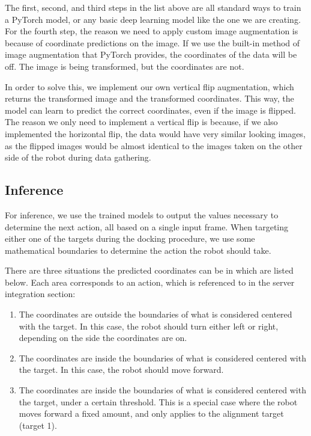 The first, second, and third steps in the list above are all standard ways to train a PyTorch model, or any basic deep learning model like the one we are creating. For the fourth step, the reason we need to apply custom image augmentation is because of coordinate predictions on the image. If we use the built-in method of image augmentation that PyTorch provides, the coordinates of the data will be off. The image is being transformed, but the coordinates are not.

In order to solve this, we implement our own vertical flip augmentation, which returns the transformed image and the transformed coordinates. This way, the model can learn to predict the correct coordinates, even if the image is flipped. The reason we only need to implement a vertical flip is because, if we also implemented the horizontal flip, the data would have very similar looking images, as the flipped images would be almost identical to the images taken on the other side of the robot during data gathering.

\subsection{Inference}
For inference, we use the trained models to output the values necessary to determine the next action, all based on a single input frame. When targeting either one of the targets during the docking procedure, we use some mathematical boundaries to determine the action the robot should take.

There are three situations the predicted coordinates can be in which are listed below. Each area corresponds to an action, which is referenced to in the server integration section:

\begin{enumerate}
	\item The coordinates are outside the boundaries of what is considered centered with the target. In this case, the robot should turn either left or right, depending on the side the coordinates are on.
	\item The coordinates are inside the boundaries of what is considered centered with the target. In this case, the robot should move forward.
	\item The coordinates are inside the boundaries of what is considered centered with the target, under a certain threshold. This is a special case where the robot moves forward a fixed amount, and only applies to the alignment target (target 1).
\end{enumerate}

